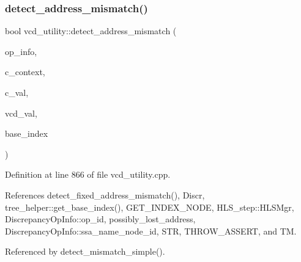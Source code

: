 \subsubsection{\texorpdfstring{detect\+\_\+address\+\_\+mismatch()}{detect\_address\_mismatch()}}
{\footnotesize\ttfamily bool vcd\+\_\+utility\+::detect\+\_\+address\+\_\+mismatch (\begin{DoxyParamCaption}\item[{const \hyperlink{classDiscrepancyOpInfo}{Discrepancy\+Op\+Info} \&}]{op\+\_\+info,  }\item[{const uint64\+\_\+t}]{c\+\_\+context,  }\item[{const std\+::string \&}]{c\+\_\+val,  }\item[{const std\+::string \&}]{vcd\+\_\+val,  }\item[{unsigned int \&}]{base\+\_\+index }\end{DoxyParamCaption})\hspace{0.3cm}{\ttfamily [protected]}}



Definition at line 866 of file vcd\+\_\+utility.\+cpp.



References detect\+\_\+fixed\+\_\+address\+\_\+mismatch(), Discr, tree\+\_\+helper\+::get\+\_\+base\+\_\+index(), G\+E\+T\+\_\+\+I\+N\+D\+E\+X\+\_\+\+N\+O\+DE, H\+L\+S\+\_\+step\+::\+H\+L\+S\+Mgr, Discrepancy\+Op\+Info\+::op\+\_\+id, possibly\+\_\+lost\+\_\+address, Discrepancy\+Op\+Info\+::ssa\+\_\+name\+\_\+node\+\_\+id, S\+TR, T\+H\+R\+O\+W\+\_\+\+A\+S\+S\+E\+RT, and TM.



Referenced by detect\+\_\+mismatch\+\_\+simple().

